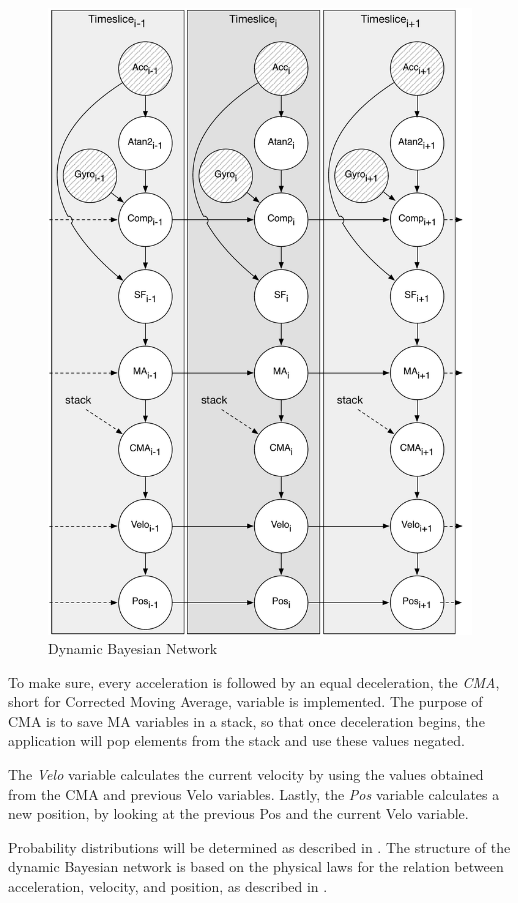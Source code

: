 \begin{figure}[H]
\centering
\includegraphics[scale=0.6]{media/dynamic-bayesian-network}
\caption{Dynamic Bayesian Network}
\label{figure:dynamic-bayesian-network}
\end{figure}

To make sure, every acceleration is followed by an equal deceleration, the \textit{CMA}, short for Corrected Moving Average, variable is implemented.
The purpose of CMA is to save MA variables in a stack, so that once deceleration begins, the application will pop elements from the stack and use these values negated.

The \textit{Velo} variable calculates the current velocity by using the values obtained from the CMA and previous Velo variables. 
Lastly, the \textit{Pos} variable calculates a new position, by looking at the previous Pos and the current Velo variable.

Probability distributions will be determined as described in .
The structure of the dynamic Bayesian network is based on the physical laws for the relation between acceleration, velocity, and position, as described in .